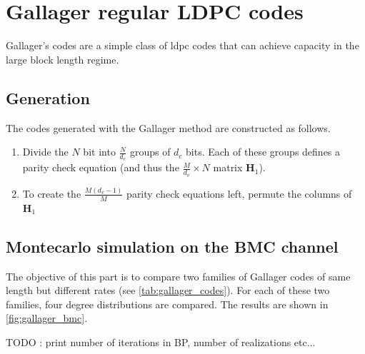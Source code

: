 \section{Gallager regular LDPC codes} \label{sec:gallager_codes}

Gallager's codes are a simple class of \acrshort{ldpc} codes that can achieve
capacity in the large block length regime.

\subsection{Generation}

The codes generated with the Gallager method are constructed as follows.
\begin{enumerate}
    \item Divide the $N$ bit into $\frac{N}{d_c}$ groups of $d_c$ bits. Each of
          these groups defines a parity check equation (and thus the
          $\frac{M}{d_v} \times N$ matrix $\bm{H}_1$).
    \item To create the $\frac{M (d_v -1)}{M}$ parity check equations left,
          permute the columns of $\bm{H}_1$
\end{enumerate}


\subsection{Montecarlo simulation on the BMC channel}

The objective of this part is to compare two families of Gallager codes of same
length but different rates (see \autoref{tab:gallager_codes}). For each of these
two families, four degree distributions are compared. The results are shown in
\autoref{fig:gallager_bmc}.

TODO : print number of iterations in BP, number of realizations etc...

